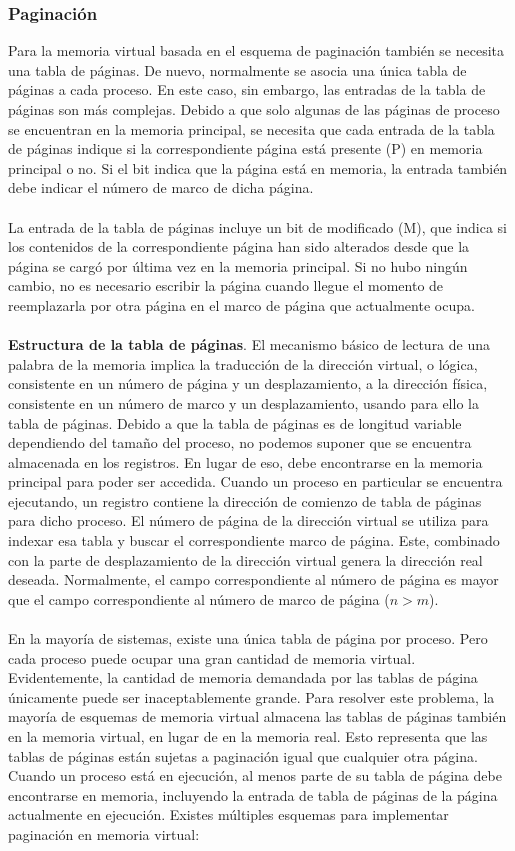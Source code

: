 \documentclass[12pt,a4paper]{article}
\begin{document}
\subsubsection{Paginación}
Para la memoria virtual basada en el esquema de paginación también se necesita una tabla de páginas. De nuevo, normalmente se asocia una única tabla de páginas a cada proceso. En este caso, sin embargo, las entradas de la tabla de páginas son más complejas. Debido a que solo algunas de las páginas de proceso se encuentran en la memoria principal, se necesita que cada entrada de la tabla de páginas indique si la correspondiente página está presente (P) en memoria principal o no. Si el bit indica que la página está en memoria, la entrada también debe indicar el número de marco de dicha página.\\\\ 
La entrada de la tabla de páginas incluye un bit de modificado (M), que indica si los contenidos de la correspondiente página han sido alterados desde que la página se cargó por última vez en la memoria principal. Si no hubo ningún cambio, no es necesario escribir la página cuando llegue el momento de reemplazarla por otra página en el marco de página que actualmente ocupa.\\\\ 
\textbf{Estructura de la tabla de páginas}. El mecanismo básico de lectura de una palabra de la memoria implica la traducción de la dirección virtual, o lógica, consistente en un número de página y un desplazamiento, a la dirección física, consistente en un número de marco y un desplazamiento, usando para ello la tabla de páginas. Debido a que la tabla de páginas es de longitud variable dependiendo del tamaño del proceso, no podemos suponer que se encuentra almacenada en los registros. En lugar de eso, debe encontrarse en la memoria principal para poder ser accedida. Cuando un proceso en particular se encuentra ejecutando, un registro contiene la dirección de comienzo de tabla de páginas para dicho proceso. El número de página de la dirección virtual se utiliza para indexar esa tabla y buscar el correspondiente marco de página. Este, combinado con la parte de desplazamiento de la dirección virtual genera la dirección real deseada. Normalmente, el campo correspondiente al número de página es mayor que el campo correspondiente al número de marco de página ($n> m$). \\\\ 
En la mayoría de sistemas, existe una única tabla de página por proceso. Pero cada proceso puede ocupar una gran cantidad de memoria virtual. Evidentemente, la cantidad de memoria demandada por las tablas de página únicamente puede ser inaceptablemente grande. Para resolver este problema, la mayoría de esquemas de memoria virtual almacena las tablas de páginas también en la memoria virtual, en lugar de en la memoria real. Esto representa que las tablas de páginas están sujetas a paginación igual que cualquier otra página. Cuando un proceso está en ejecución, al menos parte de su tabla de página debe encontrarse en memoria, incluyendo la entrada de tabla de páginas de la página actualmente en ejecución. Existes múltiples esquemas para implementar paginación en memoria virtual: \\
\end{document}
